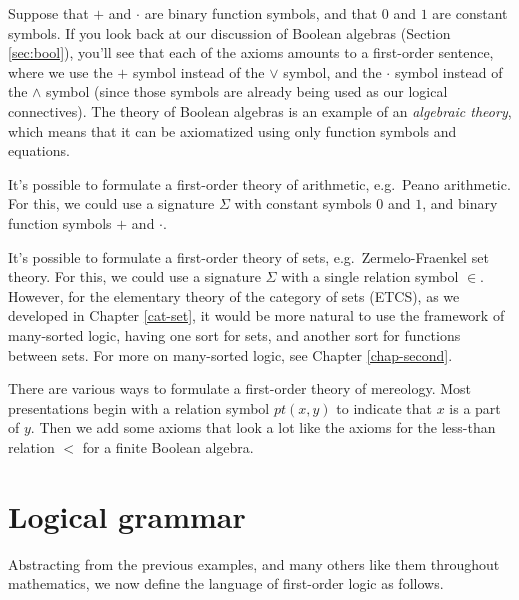 \begin{example} \label{ex:bool} Suppose that $+$ and
  $\cdot$ are binary function symbols, and that $0$ and $1$ are
  constant symbols.  If you look back at our discussion of Boolean
  algebras (Section \ref{sec:bool}), you'll see that each of the
  axioms amounts to a first-order sentence, where we use the $+$
  symbol instead of the $\vee$ symbol, and the $\cdot$ symbol instead
  of the $\wedge$ symbol (since those symbols are already being used
  as our logical connectives).  The theory of Boolean algebras is an
  example of an \emph{algebraic theory}, which means that it can be
  axiomatized using only function symbols and
  equations.  \end{example}

\begin{example}[Arithmetic] It's possible to formulate a first-order
  theory of arithmetic, e.g.\ Peano arithmetic.  For this, we could
  use a signature $\Sigma$ with constant symbols $0$ and $1$, and
  binary function symbols $+$ and $\cdot$.   \end{example}

\begin{example} It's possible to formulate a first-order
  theory of sets, e.g.\ Zermelo-Fraenkel set theory.  For this, we
  could use a signature $\Sigma$ with a single relation symbol $\in$.
  However, for the elementary theory of the category of sets (ETCS),
  as we developed in Chapter \ref{cat-set}, it would be more natural
  to use the framework of many-sorted logic, having one sort for sets,
  and another sort for functions between sets.  For more on
  many-sorted logic, see Chapter \ref{chap-second}.  \end{example}

\begin{example}[Mereology] There are various ways to formulate a
  first-order theory of mereology.  Most presentations begin with a
  relation symbol $pt (x,y)$ to indicate that $x$ is a part of $y$.
  Then we add some axioms that look a lot like the axioms for the
  less-than relation $<$ for a finite Boolean algebra.  \end{example}

\section{Logical grammar}

Abstracting from the previous examples, and many others like them
throughout mathematics, we now define the language of first-order
logic as follows.

